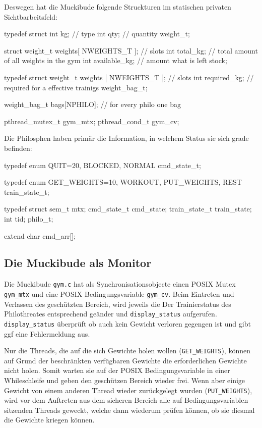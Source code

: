 \documentclass[
   draft=false
  ,paper=a4
  ,twoside=false
  ,fontsize=11pt
  ,headsepline
  ,BCOR10mm
  ,DIV11
  ,parskip=full+
]{scrartcl} %
\begin{document}
Deswegen hat die Muckibude folgende Struckturen im statischen privaten
Sichtbarbeitsfeld:
\begin{ccode}
  typedef struct {
      int kg;        // type
      int qty;       // quantity
  } weight_t;

  struct{
      weight_t weights[ NWEIGHTS_T ]; // slots
      int total_kg;                   // total amount of all weights in the gym
      int available_kg;               // amount what is left
  } stock;

  typedef struct {
      weight_t weights [ NWEIGHTS_T ];   // slots
      int required_kg;                   // required for a effective trainigs
  } weight_bag_t;

  weight_bag_t bags[NPHILO];             // for every philo one bag

  pthread_mutex_t gym_mtx;
  pthread_cond_t gym_cv;
\end{ccode}

Die Philosphen haben primär die Information, in welchem Status sie sich grade
befinden:
\begin{ccode}
typedef enum {
    QUIT=20,
    BLOCKED,
    NORMAL
} cmd_state_t;

typedef enum {
    GET_WEIGHTS=10,
    WORKOUT,
    PUT_WEIGHTS,
    REST
} train_state_t;

typedef struct {
    sem_t mtx;
    cmd_state_t cmd_state;
    train_state_t train_state;
    int tid;
} philo_t;

extend char cmd_arr[];
\end{ccode}

\subsection{Die Muckibude als Monitor}
  Die Muckibude \texttt{gym.c} hat als Synchronisationsobjecte einen POSIX
  Mutex \texttt{gym\_mtx} und eine POSIX Bedingungsvariable \texttt{gym\_cv}.
  Beim Eintreten und Verlassen des geschützten Bereich, wird jeweils die
  Der Trainierstatus des Philothreates entsprechend geänder und
  \texttt{display\_status} aufgerufen. \texttt{display\_status} überprüft
  ob auch kein Gewicht verloren gegengen ist und gibt ggf eine Fehlermeldung
  aus.

  Nur die Threads, die auf die sich Gewichte holen wollen
  (\texttt{GET\_WEIGHTS}), können auf Grund der beschränkten verfügbaren Gewichte die
  erforderlichen Gewichte nicht holen. Somit warten
  sie auf der POSIX Bedingungsvariable in einer Whileschleife und geben den
  geschützen Bereich wieder frei. Wenn aber einige Gewicht von einem anderen
  Thread wieder zurückgelegt wurden (\texttt{PUT\_WEIGHTS}), wird vor dem
  Auftreten aus dem sicheren Bereich alle auf Bedingungsvariablen sitzenden
  Threads geweckt, welche dann wiederum prüfen können, ob sie diesmal die
  Gewichte kriegen können.
\end{document}
